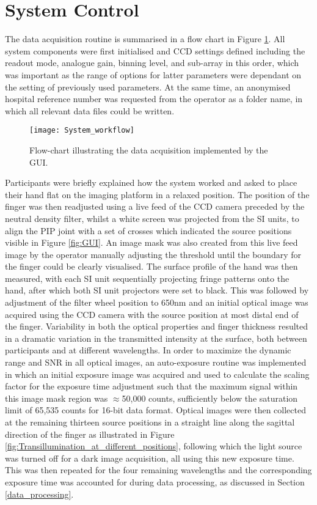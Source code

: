 \documentclass[twoside]{bhamthesis}
\theoremstyle{definition}
\begin{document}
\section{System Control}
\label{system_control}
The data acquisition routine is summarised in a flow chart in Figure \ref{fig:FLOWCHART}. All system components were first initialised and CCD settings defined including the readout mode, analogue gain, binning level, and sub-array in this order, which was important as the range of options for latter parameters were dependant on the setting of previously used parameters. At the same time, an anonymised hospital reference number was requested from the operator as a folder name, in which all relevant data files could be written. 

\begin{figure}[!ht]
\texttt{[image: System\_workflow]}
\centering
\caption{Flow-chart illustrating the data acquisition implemented by the GUI.}
  \label{fig:FLOWCHART}
\end{figure}

Participants were briefly explained how the system worked and asked to place their hand flat on the imaging platform in a relaxed position. The position of the finger was then readjusted using a live feed of the CCD camera preceded by the neutral density filter, whilst a white screen was projected from the SI units, to align the PIP joint with a set of crosses which indicated the source positions visible in Figure \ref{fig:GUI}. An image mask was also created from this live feed image by the operator manually adjusting the threshold until the boundary for the finger could be clearly visualised. The surface profile of the hand was then measured, with each SI unit sequentially projecting fringe patterns onto the hand, after which both SI unit projectors were set to black. This was followed by adjustment of the filter wheel position to 650nm and an initial optical image was acquired using the CCD camera with the source position at most distal end of the finger. Variability in both the optical properties and finger thickness resulted in a dramatic variation in the transmitted intensity at the surface, both between participants and at different wavelengths. In order to maximize the dynamic range and SNR in all optical images, an auto-exposure routine was implemented in which an initial exposure image was acquired and used to calculate the scaling factor for the exposure time adjustment such that the maximum signal within this image mask region was $\approx$50,000 counts, sufficiently below the saturation limit of 65,535 counts for 16-bit data format. Optical images were then collected at the remaining thirteen source positions in a straight line along the sagittal direction of the finger as illustrated in Figure \ref{fig:Transillumination_at_different_positions}, following which the light source was turned off for a dark image acquisition, all using this new exposure time. This was then repeated for the four remaining wavelengths and the corresponding exposure time was accounted for during data processing, as discussed in Section \ref{data_processing}. 
\end{document}
